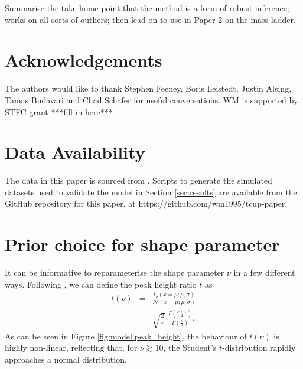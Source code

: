 \documentclass[fleqn,usenatbib]{mnras}
\newcommand{\studentt}[2]{t_\nu \left( #1, #2 \right)}
\begin{document}
Summarise the take-home point that the method is a form of robust inference;
works on all sorts of outliers; then lead on to use in Paper 2 on the mass
ladder.

\section*{Acknowledgements}

The authors would like to thank Stephen Feeney, Boris Leistedt, Justin Alsing,
Tamas Budavari and Chad Schafer for useful conversations. WM is supported by
STFC grant {\color{red} ***fill in here***}

\section*{Data Availability}


The data in this paper is sourced from \citet{Kelly:2007, Park:2017}. Scripts to
generate the simulated datasets used to validate the model in Section
\ref{sec:results} are available from the GitHub repository for this paper, at
https://github.com/wm1995/tcup-paper.







\appendix

\section{Prior choice for shape parameter}
\label{sec:t-prior}

It can be informative to reparameterise the shape parameter $\nu$ in a few
different ways. Following \citet{Feeney:2018}, we can define the peak height
ratio $t$ as
\begin{eqnarray}
    t(\nu) &=& \frac{
        \studentt{x = \mu; \mu}{\sigma}
    }{
        \mathcal N \left(x = \mu; \mu, \sigma \right)
    } \\
    &=& \sqrt{\frac{2}{\nu}} \;
    \frac{
        \Gamma\left(\frac{\nu + 1}{2}\right)
    }{
        \Gamma\left(\frac{\nu}{2}\right)
    }.
\end{eqnarray}
As can be seen in Figure \ref{fig:model.peak_height}, the behaviour of $t(\nu)$
is highly non-linear, reflecting that, for $\nu \gtrsim 10$, the Student's
$t$-distribution rapidly approaches a normal distribution.
\end{document}
